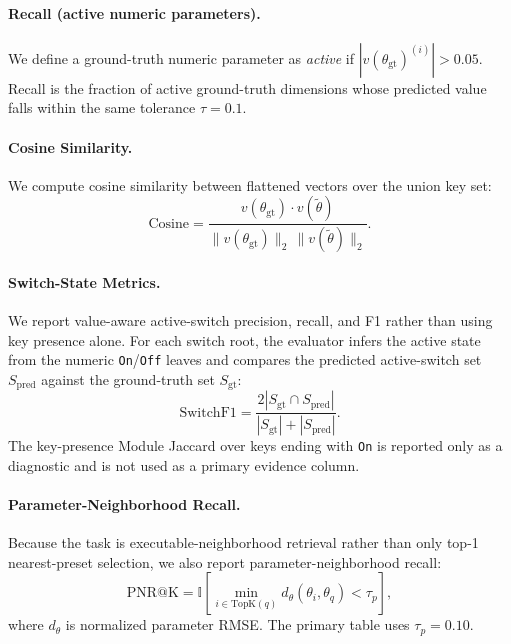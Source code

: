 \paragraph{Recall (active numeric parameters).}
We define a ground-truth numeric parameter as \emph{active} if $\left|v(\theta_{\text{gt}})^{(i)}\right|>0.05$. Recall is the fraction of active ground-truth dimensions whose predicted value falls within the same tolerance $\tau=0.1$.

\paragraph{Cosine Similarity.}
We compute cosine similarity between flattened vectors over the union key set:
\begin{equation}
		\text{Cosine} = \frac{v(\theta_{\text{gt}})\cdot v(\tilde{\theta})}{\|v(\theta_{\text{gt}})\|_2\,\|v(\tilde{\theta})\|_2}.
\end{equation}

\paragraph{Switch-State Metrics.}
We report value-aware active-switch precision, recall, and F1 rather than using key presence alone. For each switch root, the evaluator infers the active state from the numeric \texttt{On}/\texttt{Off} leaves and compares the predicted active-switch set $S_{\text{pred}}$ against the ground-truth set $S_{\text{gt}}$:
\begin{equation}
	\text{SwitchF1} = \frac{2|S_{\text{gt}}\cap S_{\text{pred}}|}{|S_{\text{gt}}|+|S_{\text{pred}}|}.
\end{equation}
The key-presence Module Jaccard over keys ending with \texttt{On} is reported only as a diagnostic and is not used as a primary evidence column.

\paragraph{Parameter-Neighborhood Recall.}
Because the task is executable-neighborhood retrieval rather than only top-1 nearest-preset selection, we also report parameter-neighborhood recall:
\begin{equation}
	\mathrm{PNR@K}=
	\mathbb{I}\left[\min_{i\in\mathrm{TopK}(q)}d_\theta(\theta_i,\theta_q)<\tau_p\right],
\end{equation}
where $d_\theta$ is normalized parameter RMSE. The primary table uses $\tau_p=0.10$.


